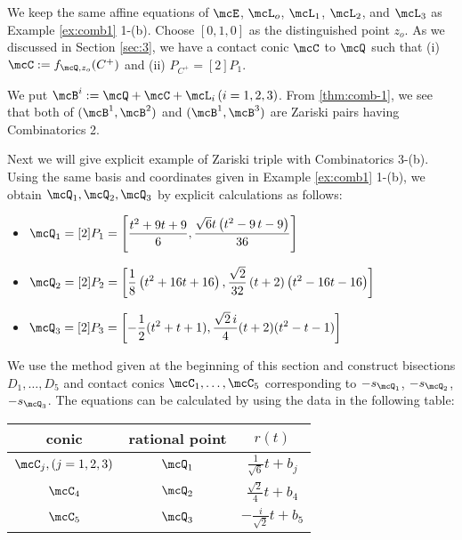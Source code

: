 \begin{exmple}[{\bf Combinatorics 2, 3-(b)}]\rm
We keep the same affine equations of $\mcE$, ${\mcL}_{o}$, ${\mcL}_{1}$, ${\mcL}_{2}$, and ${\mcL}_{3}$ as Example \ref{ex:comb1} 1-(b). Choose $[0, 1, 0]$ as the distinguished point $z_{o}$. As we discussed in Section \ref{sec:3}, we have a contact conic $\mcC$ to $\mcQ$ such that (i) $\mcC:= f_{\mcQ, z_o}(C^+)$ and (ii) $P_{C^+} = [2]P_1$. 

We put ${\mcB}^{i} := \mcQ + \mcC + {\mcL}_{i} \, (i = 1, 2, 3)$. From \ref{thm:comb-1}, we see that both of $({\mcB}^{1}, {\mcB}^{2})$ and $({\mcB}^{1}, {\mcB}^{3})$ are Zariski pairs having Combinatorics 2.

Next we will give explicit example of Zariski triple with Combinatorics 3-(b). Using the same basis and coordinates given  in Example \ref{ex:comb1} 1-(b), we obtain $\mcQ_1, \mcQ_2, \mcQ_3$ by explicit calculations as follows:
\begin{itemize}
\item $\mcQ_1=\displaystyle[2]P_{1}=\left[ \frac{{t}^{2}+9t+9}{6}, \frac{\sqrt {6}t \left( {t}^{2}-9\,t-9 \right)}{36}  \right]$
\item $\mcQ_2=\displaystyle[2]P_{2}=\left[\frac{1}{8}\left(t^2+16t+16 \right), \frac{\sqrt{2}}{32}\left(t+2\right)\left(t^2-16t-16\right) \right]$
\item $\mcQ_3=\displaystyle[2]P_{3}=\left[-\frac{1}{2}(t^2+t+1), \frac{\sqrt{2}\,i}{4} (t+2)(t^2-t-1)\right]$
\end{itemize}

We use the method given at the beginning of this section and construct bisections $D_1, \ldots, D_5$ and contact conics $\mcC_1, \ldots, \mcC_5$ corresponding to $-s_{\mcQ_1}$, $-s_{\mcQ_2}$, $-s_{\mcQ_3}$. 
The equations  can be calculated by using the data in the following table:
\begin{center}
\begin{tabular}{c|c|c}
conic & rational point & $r(t)$\\
\hline
$\mcC_j, (j=1,2,3)$ & $\mcQ_1$ & $\frac{1}{\sqrt{6}}t+b_j$\\
$\mcC_4$ & $\mcQ_2$ & $\frac{\sqrt{2}}{4}t+b_4$\\
$\mcC_5$ & $\mcQ_3$ & $-\frac{i}{\sqrt{2}}t+b_5$
\end{tabular}
\end{center}


\end{exmple}
